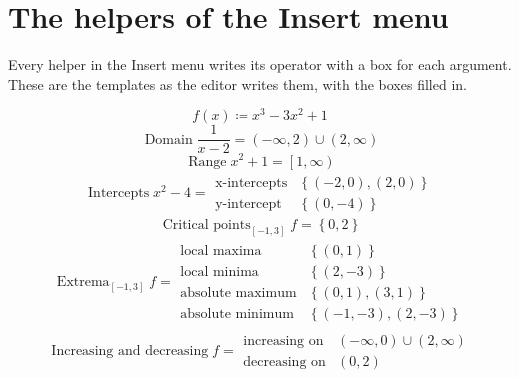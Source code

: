 \documentclass[11pt,a4paper]{article}
\theoremstyle{plain}
\theoremstyle{definition}
\theoremstyle{remark}
\begin{document}
\section*{The helpers of the Insert menu}

Every helper in the Insert menu writes its operator with a box for each argument. These are
the templates as the editor writes them, with the boxes filled in.

\begin{equation*}
  f(x) \coloneqq  x^3 - 3x^2 + 1
\end{equation*}
\begin{equation*}
  \operatorname{Domain} {\frac{1}{x - 2}} = \left(-\infty, 2\right) \cup \left(2, \infty\right)
\end{equation*}
\begin{equation*}
  \operatorname{Range} {x^2 + 1} = \left[1, \infty\right)
\end{equation*}
\begin{align*}
  \operatorname{Intercepts} {x^2 - 4} = \begin{array}{ll} \text{x-intercepts} & \left\{\left(-2, 0\right), \left(2, 0\right)\right\} \\ \text{y-intercept} & \left\{\left(0, -4\right)\right\} \end{array}
\end{align*}
\begin{equation*}
  \operatorname{Critical\ points}_{[-1, 3]} {f} = \left\{0, 2\right\}
\end{equation*}
\begin{align*}
  \operatorname{Extrema}_{[-1, 3]} {f} = \begin{array}{ll} \text{local maxima} & \left\{\left(0, 1\right)\right\} \\ \text{local minima} & \left\{\left(2, -3\right)\right\} \\ \text{absolute maximum} & \left\{\left(0, 1\right), \left(3, 1\right)\right\} \\ \text{absolute minimum} & \left\{\left(-1, -3\right), \left(2, -3\right)\right\} \end{array}
\end{align*}
\begin{align*}
  \operatorname{Increasing\ and\ decreasing} {f} = \begin{array}{ll} \text{increasing on} & \left(-\infty, 0\right) \cup \left(2, \infty\right) \\ \text{decreasing on} & \left(0, 2\right) \end{array}
\end{align*}
\end{document}
